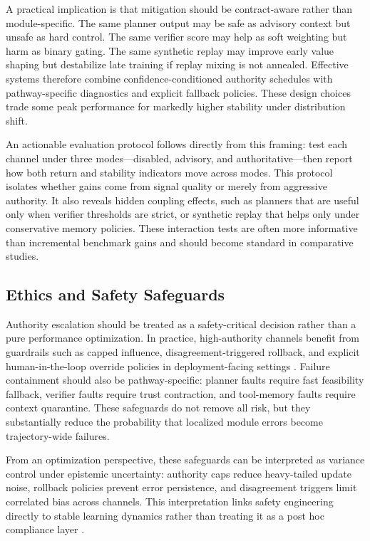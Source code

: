 \documentclass[pdflatex,sn-mathphys-num]{sn-jnl}
\begin{document}
A practical implication is that mitigation should be contract-aware rather than module-specific. The same planner output may be safe as advisory context but unsafe as hard control. The same verifier score may help as soft weighting but harm as binary gating. The same synthetic replay may improve early value shaping but destabilize late training if replay mixing is not annealed. Effective systems therefore combine confidence-conditioned authority schedules with pathway-specific diagnostics and explicit fallback policies. These design choices trade some peak performance for markedly higher stability under distribution shift.

An actionable evaluation protocol follows directly from this framing: test each channel under three modes---disabled, advisory, and authoritative---then report how both return and stability indicators move across modes. This protocol isolates whether gains come from signal quality or merely from aggressive authority. It also reveals hidden coupling effects, such as planners that are useful only when verifier thresholds are strict, or synthetic replay that helps only under conservative memory policies. These interaction tests are often more informative than incremental benchmark gains and should become standard in comparative studies.

\subsection*{Ethics and Safety Safeguards}
Authority escalation should be treated as a safety-critical decision rather than a pure performance optimization. In practice, high-authority channels benefit from guardrails such as capped influence, disagreement-triggered rollback, and explicit human-in-the-loop override policies in deployment-facing settings \cite{arxiv_p_2512_05686,arxiv_p_2602_09367,arxiv_p_2602_13156}. Failure containment should also be pathway-specific: planner faults require fast feasibility fallback, verifier faults require trust contraction, and tool-memory faults require context quarantine. These safeguards do not remove all risk, but they substantially reduce the probability that localized module errors become trajectory-wide failures.

From an optimization perspective, these safeguards can be interpreted as variance control under epistemic uncertainty: authority caps reduce heavy-tailed update noise, rollback policies prevent error persistence, and disagreement triggers limit correlated bias across channels. This interpretation links safety engineering directly to stable learning dynamics rather than treating it as a post hoc compliance layer \cite{arxiv_p_2602_06493,arxiv_p_2602_12579,arxiv_p_2602_14468}.
\end{document}
